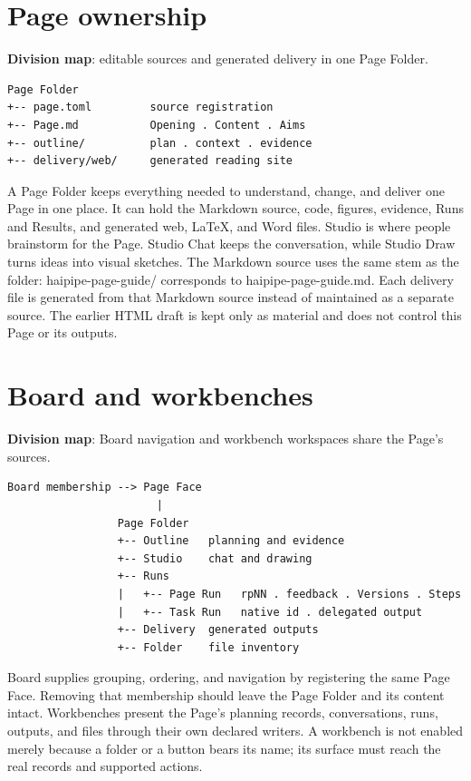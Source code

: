 
\section{Page ownership}
\textbf{Division map}: editable sources and generated delivery in one Page Folder.

\begin{verbatim}
Page Folder
+-- page.toml         source registration
+-- Page.md           Opening . Content . Aims
+-- outline/          plan . context . evidence
+-- delivery/web/     generated reading site
\end{verbatim}
A Page Folder keeps everything needed to understand, change, and deliver one Page in one place. It can hold the Markdown source, code, figures, evidence, Runs and Results, and generated web, LaTeX, and Word files. Studio is where people brainstorm for the Page. Studio Chat keeps the conversation, while Studio Draw turns ideas into visual sketches. The Markdown source uses the same stem as the folder: haipipe-page-guide/ corresponds to haipipe-page-guide.md. Each delivery file is generated from that Markdown source instead of maintained as a separate source. The earlier HTML draft is kept only as material and does not control this Page or its outputs.


\section{Board and workbenches}
\textbf{Division map}: Board navigation and workbench workspaces share the Page's sources.

\begin{verbatim}
Board membership --> Page Face
                       |
                 Page Folder
                 +-- Outline   planning and evidence
                 +-- Studio    chat and drawing
                 +-- Runs
                 |   +-- Page Run   rpNN . feedback . Versions . Steps
                 |   +-- Task Run   native id . delegated output
                 +-- Delivery  generated outputs
                 +-- Folder    file inventory
\end{verbatim}
Board supplies grouping, ordering, and navigation by registering the same Page Face. Removing that membership should leave the Page Folder and its content intact. Workbenches present the Page's planning records, conversations, runs, outputs, and files through their own declared writers. A workbench is not enabled merely because a folder or a button bears its name; its surface must reach the real records and supported actions.

